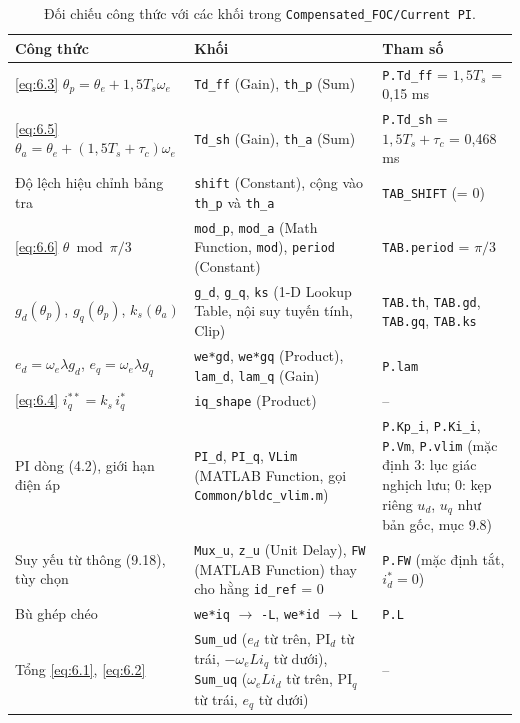 \begin{table}[H]
\centering\small
\caption{Đối chiếu công thức với các khối trong \texttt{Compensated\_FOC/Current PI}.}\label{tab:6.2}
\begin{tabularx}{\linewidth}{@{}>{\raggedright\arraybackslash}X>{\raggedright\arraybackslash}X>{\raggedright\arraybackslash}X@{}}
\toprule
Công thức & Khối & Tham số \\ \midrule
\eqref{eq:6.3} $\theta_p = \theta_e + 1{,}5T_s\omega_e$ & \texttt{Td\_ff} (Gain), \texttt{th\_p} (Sum) & \texttt{P.Td\_ff} = $1{,}5T_s$ = 0,15 ms \\
\eqref{eq:6.5} $\theta_a = \theta_e + (1{,}5T_s+\tau_c)\omega_e$ & \texttt{Td\_sh} (Gain), \texttt{th\_a} (Sum) & \texttt{P.Td\_sh} = $1{,}5T_s + \tau_c$ = 0,468 ms \\
Độ lệch hiệu chỉnh bảng tra & \texttt{shift} (Constant), cộng vào \texttt{th\_p} và \texttt{th\_a} & \texttt{TAB\_SHIFT} (= 0) \\
\eqref{eq:6.6} $\theta \bmod \pi/3$ & \texttt{mod\_p}, \texttt{mod\_a} (Math Function, \texttt{mod}), \texttt{period} (Constant) & \texttt{TAB.period} = $\pi/3$ \\
$g_d(\theta_p)$, $g_q(\theta_p)$, $k_s(\theta_a)$ & \texttt{g\_d}, \texttt{g\_q}, \texttt{ks} (1-D Lookup Table, nội suy tuyến tính, Clip) & \texttt{TAB.th}, \texttt{TAB.gd}, \texttt{TAB.gq}, \texttt{TAB.ks} \\
$e_d = \omega_e\lambda g_d$, $e_q = \omega_e\lambda g_q$ & \texttt{we*gd}, \texttt{we*gq} (Product), \texttt{lam\_d}, \texttt{lam\_q} (Gain) & \texttt{P.lam} \\
\eqref{eq:6.4} $i_q^{**} = k_s\, i_q^*$ & \texttt{iq\_shape} (Product) & – \\
PI dòng (4.2), giới hạn điện áp & \texttt{PI\_d}, \texttt{PI\_q}, \texttt{VLim} (MATLAB Function, gọi \texttt{Common/bldc\_vlim.m}) & \texttt{P.Kp\_i}, \texttt{P.Ki\_i}, \texttt{P.Vm}, \texttt{P.vlim} (mặc định 3: lục giác nghịch lưu; 0: kẹp riêng $u_d$, $u_q$ như bản gốc, mục 9.8) \\
Suy yếu từ thông (9.18), tùy chọn & \texttt{Mux\_u}, \texttt{z\_u} (Unit Delay), \texttt{FW} (MATLAB Function) thay cho hằng \texttt{id\_ref} = 0 & \texttt{P.FW} (mặc định tắt, $i_d^* = 0$) \\
Bù ghép chéo & \texttt{we*iq} $\to$ \texttt{-L}, \texttt{we*id} $\to$ \texttt{L} & \texttt{P.L} \\
Tổng \eqref{eq:6.1}, \eqref{eq:6.2} & \texttt{Sum\_ud} ($e_d$ từ trên, PI$_d$ từ trái, $-\omega_e L i_q$ từ dưới), \texttt{Sum\_uq} ($\omega_e L i_d$ từ trên, PI$_q$ từ trái, $e_q$ từ dưới) & – \\
\bottomrule
\end{tabularx}
\end{table}


